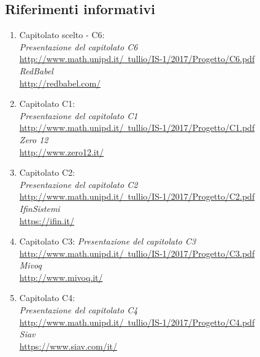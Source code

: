 \documentclass[StudioDiFattibilità.tex]{subfiles}
\begin{document}
\subsection{Riferimenti informativi}
\begin{enumerate}
	\item Capitolato scelto - C6:\\
		\textit{Presentazione del capitolato C6}\\
		\href{http://www.math.unipd.it/~tullio/IS-1/2017/Progetto/C6.pdf}{http://www.math.unipd.it/~tullio/IS-1/2017/Progetto/C6.pdf}\\
		\textit{RedBabel}\\
		\href{http://redbabel.com/}{http://redbabel.com/}\\
		
	\item Capitolato C1:\\
		\textit{Presentazione del capitolato C1}\\
		\href{http://www.math.unipd.it/~tullio/IS-1/2017/Progetto/C1.pdf}{http://www.math.unipd.it/~tullio/IS-1/2017/Progetto/C1.pdf}\\
		\textit{Zero 12}\\
		\href{http://www.zero12.it/}{http://www.zero12.it/}\\
		
	\item Capitolato C2:\\
		\textit{Presentazione del capitolato C2}\\
		\href{http://www.math.unipd.it/~tullio/IS-1/2017/Progetto/C2.pdf}{http://www.math.unipd.it/~tullio/IS-1/2017/Progetto/C2.pdf}\\
		\textit{IfinSistemi}\\
		\href{https://ifin.it/}{https://ifin.it/}\\
		
	\item Capitolato C3:
		\textit{Presentazione del capitolato C3}\\
		\href{http://www.math.unipd.it/~tullio/IS-1/2017/Progetto/C3.pdf}{http://www.math.unipd.it/~tullio/IS-1/2017/Progetto/C3.pdf}\\
		\textit{Mivoq}\\
		\href{http://www.mivoq.it/}{http://www.mivoq.it/}\\
		
	\item Capitolato C4:\\
		\textit{Presentazione del capitolato C4}\\
		\href{http://www.math.unipd.it/~tullio/IS-1/2017/Progetto/C4.pdf}{http://www.math.unipd.it/~tullio/IS-1/2017/Progetto/C4.pdf}\\
		\textit{Siav}\\
		\href{https://www.siav.com/it/}{https://www.siav.com/it/}\\
		

\end{enumerate}
\end{document}
